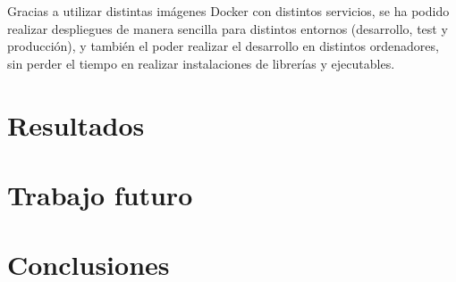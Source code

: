 \documentclass{\ClassPath/viu-tfm-template}
\begin{document}
Gracias a utilizar distintas imágenes Docker con distintos servicios, se ha podido realizar despliegues de manera sencilla para distintos entornos (desarrollo, test y producción), y también el poder realizar el desarrollo en distintos ordenadores, sin perder el tiempo en realizar instalaciones de librerías y ejecutables.





\chapter{Resultados}




\chapter{Trabajo futuro}







\chapter{Conclusiones}



\printbibliography[title={Referencias bibliográficas},heading=bibintoc]
\end{document}
